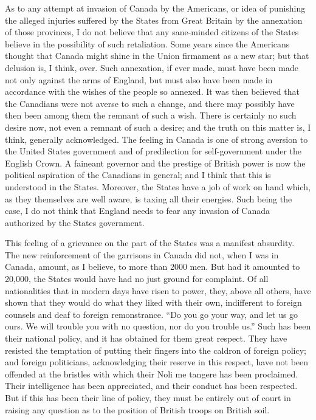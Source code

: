 As to any attempt at invasion of Canada by the Americans, or idea
of punishing the alleged injuries suffered by the States from Great
Britain by the annexation of those provinces, I do not believe that
any sane-minded citizens of the States believe in the possibility
of such retaliation.  Some years since the Americans thought that
Canada might shine in the Union firmament as a new star; but that
delusion is, I think, over.  Such annexation, if ever made, must
have been made not only against the arms of England, but must also
have been made in accordance with the wishes of the people so
annexed.  It was then believed that the Canadians were not averse
to such a change, and there may possibly have then been among them
the remnant of such a wish.  There is certainly no such desire now,
not even a remnant of such a desire; and the truth on this matter
is, I think, generally acknowledged.  The feeling in Canada is one
of strong aversion to the United States government and of
predilection for self-government under the English Crown.  A
faineant governor and the prestige of British power is now the
political aspiration of the Canadians in general; and I think that
this is understood in the States.  Moreover, the States have a job
of work on hand which, as they themselves are well aware, is taxing
all their energies.  Such being the case, I do not think that
England needs to fear any invasion of Canada authorized by the
States government.

This feeling of a grievance on the part of the States was a
manifest absurdity.  The new reinforcement of the garrisons in
Canada did not, when I was in Canada, amount, as I believe, to more
than 2000 men.  But had it amounted to 20,000, the States would
have had no just ground for complaint.  Of all nationalities that
in modern days have risen to power, they, above all others, have
shown that they would do what they liked with their own,
indifferent to foreign counsels and deaf to foreign remonstrance.
``Do you go your way, and let us go ours.  We will trouble you with
no question, nor do you trouble us.''  Such has been their national
policy, and it has obtained for them great respect.  They have
resisted the temptation of putting their fingers into the caldron
of foreign policy; and foreign politicians, acknowledging their
reserve in this respect, have not been offended at the bristles
with which their Noli me tangere has been proclaimed.  Their
intelligence has been appreciated, and their conduct has been
respected.  But if this has been their line of policy, they must be
entirely out of court in raising any question as to the position of
British troops on British soil.

